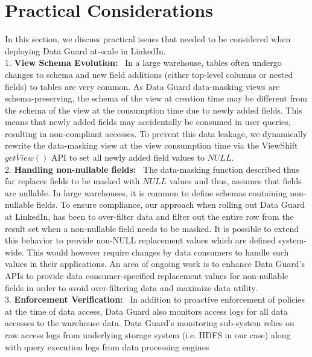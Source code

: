 \section{Practical Considerations} \label{sec:considerations}
In this section, we discuss practical issues that needed to be considered when deploying Data Guard at-scale in LinkedIn. \\
1. {\bf View Schema Evolution: } \
In a large warehouse, tables often undergo changes to schema and new field additions (either top-level columns or nested fields) to tables are very common. As Data Guard data-masking views are schema-preserving,
the schema of the view at creation time may be different from the schema of the view at the consumption time due to newly added fields. This means that newly added fields may accidentally be consumed in user queries, 
resulting in non-compliant accesses. To prevent this data leakage, we dynamically rewrite the data-masking view at the view consumption time via the ViewShift $getView()$ API to set all newly added field values to $NULL$. \\ 
2. {\bf Handling non-nullable fields: } \
The data-masking function described thus far replaces fields to be masked with $NULL$ values and thus, assumes that fields are nullable. 
In large warehouses, it is common to define schemas containing non-nullable fields. 
To ensure compliance, our approach when rolling out Data Guard at LinkedIn, has been to over-filter data and filter out the entire row from the result set when a non-nullable field needs to be masked. It is possible to extend this behavior to provide non-NULL replacement values which are defined system-wide. This would however require changes by data consumers to handle such values in their applications. 
An area of ongoing work is to enhance Data Guard's APIs to provide data consumer-specified replacement values for non-nullable fields in order to avoid over-filtering data and maximize data utility. \\
3. {\bf Enforcement Verification: } \ 
In addition to proactive enforcement of policies at the time of data access, Data Guard also monitors access logs for all data accesses to the warehouse data. 
Data Guard's monitoring sub-system relies on raw access logs from underlying storage system (i.e. HDFS in our case) along with query execution logs from data processing engines 
